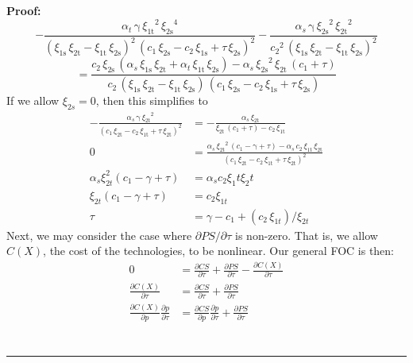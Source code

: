 \documentclass[12pt,a4paper]{extarticle}
\newenvironment{proof}[1][Proof]{\noindent\textbf{#1:} }{\ \rule{0.5em}{0.5em}}
\begin{document}
\begin{proof}
$$-\frac{\alpha _{t}\,\mathrm{\gamma}\,{\xi _{\mathrm{1t}}}^2\,{\xi _{\mathrm{2s}}}^4}{{\left(\xi _{\mathrm{1s}}\,\xi _{\mathrm{2t}}-\xi _{\mathrm{1t}}\,\xi _{\mathrm{2s}}\right)}^2\,{\left(c_{1}\,\xi _{\mathrm{2s}}-c_{2}\,\xi _{\mathrm{1s}}+\tau \,\xi _{\mathrm{2s}}\right)}^2}-\frac{\alpha _{s}\,\mathrm{\gamma}\,{\xi _{\mathrm{2s}}}^2\,{\xi _{\mathrm{2t}}}^2}{{c_{2}}^2\,{\left(\xi _{\mathrm{1s}}\,\xi _{\mathrm{2t}}-\xi _{\mathrm{1t}}\,\xi _{\mathrm{2s}}\right)}^2} $$
$$ = 	
\frac{c_{2}\,\xi _{\mathrm{2s}}\,\left(\alpha _{s}\,\xi _{\mathrm{1s}}\,\xi _{\mathrm{2t}}+\alpha _{t}\,\xi _{\mathrm{1t}}\,\xi _{\mathrm{2s}}\right)-\alpha _{s}\,{\xi _{\mathrm{2s}}}^2\,\xi _{\mathrm{2t}}\,\left(c_{1}+\tau \right)}{c_{2}\,\left(\xi _{\mathrm{1s}}\,\xi _{\mathrm{2t}}-\xi _{\mathrm{1t}}\,\xi _{\mathrm{2s}}\right)\,\left(c_{1}\,\xi _{\mathrm{2s}}-c_{2}\,\xi _{\mathrm{1s}}+\tau \,\xi _{\mathrm{2s}}\right)}
$$
If we allow $\xi_{2s} = 0$, then this simplifies to
\begin{align*}
-\frac{\alpha _{s}\,\mathrm{\gamma}\,{\xi _{\mathrm{2t}}}^2}{{\left(c_{1}\,\xi _{\mathrm{2t}}-c_{2}\,\xi _{\mathrm{1t}}+\tau \,\xi _{\mathrm{2t}}\right)}^2} &= -\frac{\alpha _{s}\,\xi _{\mathrm{2t}}}{\xi _{\mathrm{2t}}\,\left(c_{1}+\tau \right)-c_{2}\,\xi _{\mathrm{1t}}}\\
0 &= \frac{\alpha _{s}\,{\xi _{\mathrm{2t}}}^2\,\left(c_{1}-\mathrm{\gamma}+\tau \right)-\alpha _{s}\,c_{2}\,\xi _{\mathrm{1t}}\,\xi _{\mathrm{2t}}}{{\left(c_{1}\,\xi _{\mathrm{2t}}-c_{2}\,\xi _{\mathrm{1t}}+\tau \,\xi _{\mathrm{2t}}\right)}^2} \\
\alpha_s \xi_{2t}^2 (c_1 - \gamma + \tau) &= \alpha_s c_2 \xi_1t \xi_2t
 \\
\xi_{2t} (c_1 - \gamma + \tau) &=  c_2 \xi_{1t}\\
\tau &= 
\gamma - c_1 + (c_2\,\xi_{1t})/\xi_{2t}
\end{align*}
Next, we may consider the case where $\partial PS / \partial \tau$ is non-zero. That is, we allow $C(X)$, the cost of the technologies, to be nonlinear. Our general FOC is then:
\begin{align*}
0 &= \frac{\partial CS}{\partial \tau} + \frac{\partial PS}{\partial \tau} - \frac{\partial C(X)}{\partial \tau}\\
\frac{\partial C(X)}{\partial \tau} &= \frac{\partial CS}{\partial \tau} + \frac{\partial PS}{\partial \tau} \\
\frac{ \partial  C(X)}{\partial p} \frac{\partial p}{\partial \tau}  &= \frac{\partial CS}{\partial p} \frac{\partial p}{\partial \tau} + \frac{\partial PS}{\partial \tau} \\

\end{align*}
\end{proof}
\end{document}

